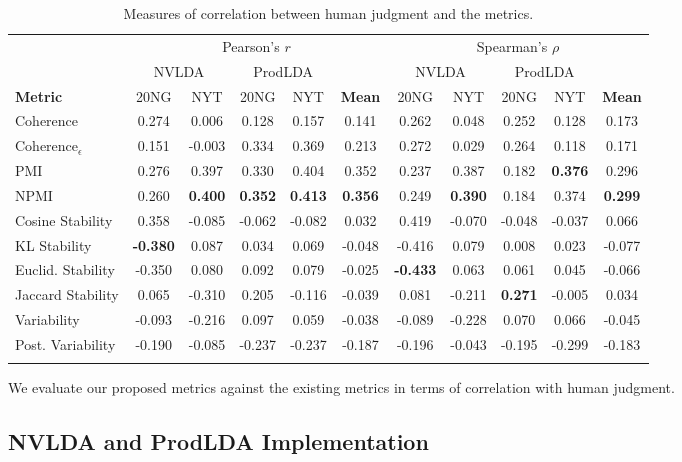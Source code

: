 \documentclass[10pt]{article}
\begin{document}
\begin{table*}[t]
\centering
\begin{tabular}{l|ccccc|ccccc}
\Xhline{4\arrayrulewidth}
& \multicolumn{5}{c|}{Pearson's $r$} & \multicolumn{5}{c}{Spearman's $\rho$} \\
& \multicolumn{2}{c}{NVLDA} & \multicolumn{2}{c}{ProdLDA} & & \multicolumn{2}{c}{NVLDA} & \multicolumn{2}{c}{ProdLDA} & \\
\textbf{Metric} & 20NG & NYT & 20NG & NYT & \textbf{Mean} & 20NG & NYT & 20NG & NYT & \textbf{Mean} \\
\hline
Coherence & 0.274 & 0.006 & 0.128 & 0.157 & 0.141 & 0.262 & 0.048 & 0.252 & 0.128 & 0.173 \\
Coherence$_\epsilon$ & 0.151 &-0.003 & 0.334 & 0.369 & 0.213 & 0.272 & 0.029 & 0.264 & 0.118 & 0.171 \\
PMI & 0.276 & 0.397 & 0.330 & 0.404 & 0.352 & 0.237 & 0.387 & 0.182 & \textbf{0.376} & 0.296 \\
NPMI & 0.260 & \textbf{0.400} & \textbf{0.352} & \textbf{0.413} & \textbf{0.356} & 0.249 & \textbf{0.390} & 0.184 & 0.374 & \textbf{0.299} \\
\hline
Cosine Stability & 0.358 & -0.085 & -0.062 & -0.082 & 0.032 & 0.419 & -0.070 & -0.048 & -0.037 & 0.066 \\
KL Stability & \textbf{-0.380} & 0.087 & 0.034 & 0.069 & -0.048 & -0.416 & 0.079 & 0.008 & 0.023 & -0.077 \\
Euclid. Stability & -0.350 & 0.080 & 0.092 & 0.079 & -0.025 & \textbf{-0.433} & 0.063 & 0.061 & 0.045 & -0.066 \\
Jaccard Stability & 0.065 & -0.310 & 0.205 & -0.116 & -0.039 & 0.081 & -0.211 & \textbf{0.271} & -0.005 & 0.034 \\
Variability & -0.093 & -0.216 & 0.097 & 0.059 & -0.038 & -0.089 & -0.228 & 0.070 & 0.066 & -0.045 \\
Post. Variability & -0.190 & -0.085 & -0.237 & -0.237 & -0.187 & -0.196 & -0.043 & -0.195 & -0.299 & -0.183 \\
\Xhline{4\arrayrulewidth}
\end{tabular}
\caption{Measures of correlation between human judgment and the metrics.}
\label{tab:correlation}
\end{table*}

We evaluate our proposed metrics against the existing metrics in terms of correlation with human judgment.

\subsection{NVLDA and ProdLDA Implementation}
\end{document}
